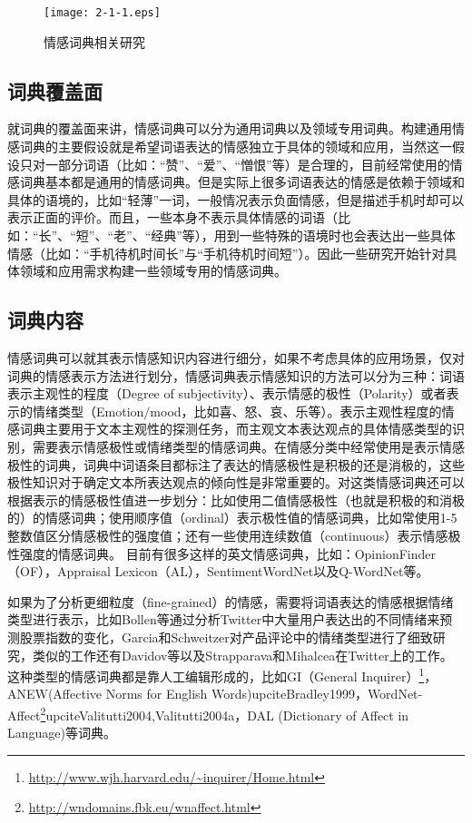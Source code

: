 \begin{figure}[htp]
\centering
\texttt{[image: 2-1-1.eps]}
\caption{情感词典相关研究}
\label{fig2-1-1}
\end{figure}

\subsection{词典覆盖面}
就词典的覆盖面来讲，情感词典可以分为通用词典以及领域专用词典。构建通用情感词典的主要假设就是希望词语表达的情感独立于具体的领域和应用，当然这一假设只对一部分词语（比如：“赞”、“爱”、“憎恨”等）是合理的，目前经常使用的情感词典基本都是通用的情感词典。但是实际上很多词语表达的情感是依赖于领域和具体的语境的，比如“轻薄”一词，一般情况表示负面情感，但是描述手机时却可以表示正面的评价。而且，一些本身不表示具体情感的词语（比如：“长”、“短”、“老”、“经典”等），用到一些特殊的语境时也会表达出一些具体情感（比如：“手机待机时间长”与“手机待机时间短”）。因此一些研究开始针对具体领域和应用需求构建一些领域专用的情感词典。

\subsection{词典内容}
情感词典可以就其表示情感知识内容进行细分，如果不考虑具体的应用场景，仅对词典的情感表示方法进行划分，情感词典表示情感知识的方法可以分为三种：词语表示主观性的程度（Degree of subjectivity）、表示情感的极性（Polarity）或者表示的情绪类型（Emotion$ / $mood，比如喜、怒、哀、乐等）。表示主观性程度的情感词典主要用于文本主观性的探测任务，而主观文本表达观点的具体情感类型的识别，需要表示情感极性或情绪类型的情感词典。在情感分类中经常使用是表示情感极性的词典，词典中词语条目都标注了表达的情感极性是积极的还是消极的，这些极性知识对于确定文本所表达观点的倾向性是非常重要的。对这类情感词典还可以根据表示的情感极性值进一步划分：比如使用二值情感极性（也就是积极的和消极的）的情感词典；使用顺序值（ordinal）表示极性值的情感词典，比如常使用1-5整数值区分情感极性的强度值；还有一些使用连续数值（continuous）表示情感极性强度的情感词典。
目前有很多这样的英文情感词典，比如：OpinionFinder（OF），Appraisal Lexicon（AL），SentimentWordNet以及Q-WordNet等。

如果为了分析更细粒度（fine-grained）的情感，需要将词语表达的情感根据情绪类型进行表示，比如Bollen等通过分析Twitter中大量用户表达出的不同情绪来预测股票指数的变化，Garcia和Schweitzer对产品评论中的情绪类型进行了细致研究，类似的工作还有Davidov等以及Strapparava和Mihalcea在Twitter上的工作。这种类型的情感词典都是靠人工编辑形成的，比如GI（General Inquirer）\footnote{\url{http://www.wjh.harvard.edu/~inquirer/Home.html}}，ANEW(Affective Norms for English Words)upcite{Bradley1999}，WordNet-Affect\footnote{\url{http://wndomains.fbk.eu/wnaffect.html}}upcite{Valitutti2004,Valitutti2004a}，DAL (Dictionary of Affect in Language)等词典。

